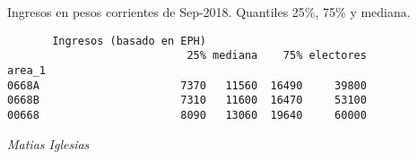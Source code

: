 \documentclass[11pt]{article}
\begin{document}
    
    Ingresos en pesos corrientes de Sep-2018. Quantiles 25\%, 75\% y
mediana.

    
    
    \begin{verbatim}
       Ingresos (basado en EPH)                         
                            25% mediana    75% electores
area_1                                                  
0668A                      7370   11560  16490     39800
0668B                      7310   11600  16470     53100
00668                      8090   13060  19640     60000
    \end{verbatim}

    
    \emph{Matias Iglesias}


    
    
    
    
\end{document}
